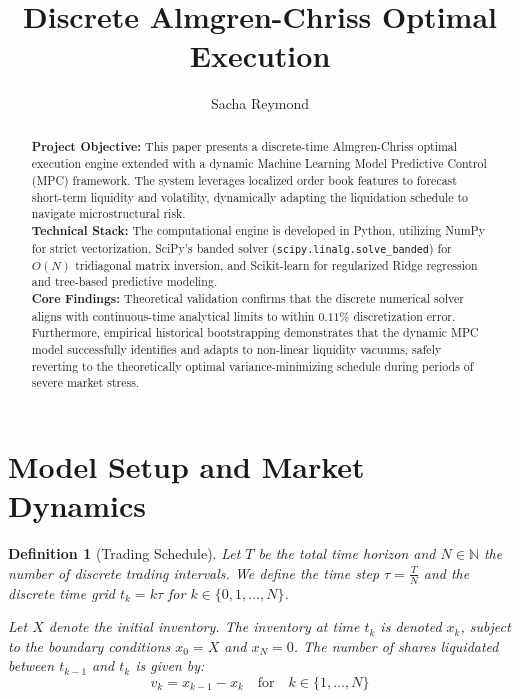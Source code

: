 \documentclass[11pt,a4paper]{article}
\title{Discrete Almgren-Chriss Optimal Execution}
\author{Sacha Reymond}
\date{}
\newtheorem{definition}[theorem]{Definition}
\begin{document}
\maketitle

\begin{abstract}
\noindent \textbf{Project Objective:} This paper presents a discrete-time Almgren-Chriss optimal execution engine extended with a dynamic Machine Learning Model Predictive Control (MPC) framework. The system leverages localized order book features to forecast short-term liquidity and volatility, dynamically adapting the liquidation schedule to navigate microstructural risk. \\

\noindent \textbf{Technical Stack:} The computational engine is developed in Python, utilizing NumPy for strict vectorization, SciPy's banded solver (\texttt{scipy.linalg.solve\_banded}) for $O(N)$ tridiagonal matrix inversion, and Scikit-learn for regularized Ridge regression and tree-based predictive modeling. \\

\noindent \textbf{Core Findings:} Theoretical validation confirms that the discrete numerical solver aligns with continuous-time analytical limits to within $0.11\%$ discretization error. Furthermore, empirical historical bootstrapping demonstrates that the dynamic MPC model successfully identifies and adapts to non-linear liquidity vacuums, safely reverting to the theoretically optimal variance-minimizing schedule during periods of severe market stress.
\end{abstract}

\section{Model Setup and Market Dynamics}

\begin{definition}[Trading Schedule]
Let $T$ be the total time horizon and $N \in \mathbb{N}$ the number of discrete trading intervals. We define the time step $\tau = \frac{T}{N}$ and the discrete time grid $t_k = k \tau$ for $k \in \{0, 1, \dots, N\}$. 

Let $X$ denote the initial inventory. The inventory at time $t_k$ is denoted $x_k$, subject to the boundary conditions $x_0 = X$ and $x_N = 0$. The number of shares liquidated between $t_{k-1}$ and $t_k$ is given by:
\[ v_k = x_{k-1} - x_k \quad \text{for} \quad k \in \{1, \dots, N\} \]
\end{definition}
\end{document}
